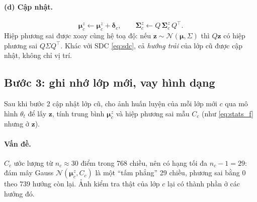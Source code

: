 \documentclass[11pt]{article}
\newcommand{\bmu}{\boldsymbol{\mu}}
\newcommand{\bSigma}{\boldsymbol{\Sigma}}
\newcommand{\vz}{\mathbf{z}}
\newcommand{\muz}{\bmu^{z}}
\newcommand{\Sz}{\bSigma^{z}}
\begin{document}
\paragraph{(d) Cập nhật.}
\begin{equation}\label{eq:transport}
\muz_c\leftarrow\muz_c+\boldsymbol\delta_c,\qquad \Sz_c\leftarrow Q\,\Sz_c\,Q^\top .
\end{equation}
Hiệp phương sai được xoay cùng hệ toạ độ: nếu $\vz\sim\mathcal N(\bmu,\Sigma)$ thì $Q\vz$ có hiệp phương sai
$Q\Sigma Q^\top$. Khác với SDC \eqref{eq:sdc}, cả \emph{hướng trải} của lớp cũ được cập nhật, không chỉ vị trí.

\subsection{Bước 3: ghi nhớ lớp mới, vay hình dạng}\label{sec:step3}
Sau khi bước 2 cập nhật lớp cũ, cho ảnh huấn luyện của mỗi lớp mới $c$ qua mô hình $\theta_t$ để lấy $\vz$, tính trung
bình $\muz_c$ và hiệp phương sai mẫu $C_c$ (như \eqref{eq:stats_f} nhưng ở $\vz$).

\paragraph{Vấn đề.} $C_c$ ước lượng từ $n_c\approx30$ điểm trong 768 chiều, nên có hạng tối đa $n_c-1=29$: đám mây Gauss
$\mathcal N(\muz_c,C_c)$ là một ``tấm phẳng'' 29 chiều, phương sai bằng 0 theo 739 hướng còn lại. Ảnh kiểm tra thật của
lớp $c$ lại có thành phần ở các hướng đó.
\end{document}
